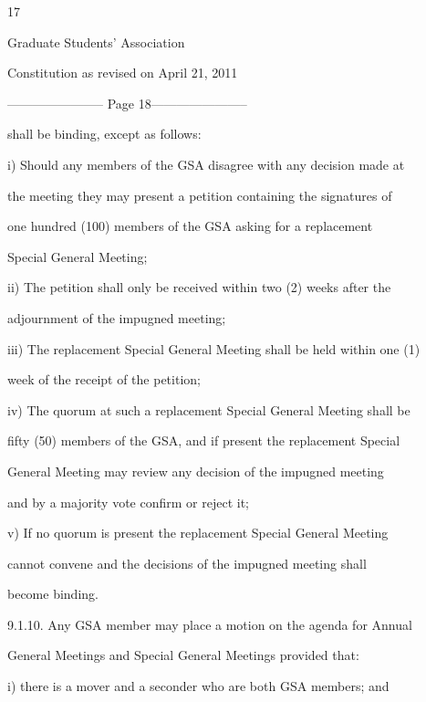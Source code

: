 \documentclass{article}
\begin{document}
     17  



       Graduate Students’ Association  



  Constitution as revised on April 21, 2011  


----------------------- Page 18-----------------------

shall be binding, except as follows:  



i)      Should any members of the GSA disagree with any decision made at  

the  meeting  they  may  present  a  petition  containing  the  signatures  of  

one  hundred  (100)  members  of  the  GSA  asking  for  a  replacement  

Special General Meeting;  



ii)     The  petition  shall  only  be  received  within  two  (2)  weeks  after  the  

adjournment of the impugned meeting;  



iii)    The replacement Special General Meeting shall be held within one (1)  

week of the receipt of the petition;  



iv)     The quorum at such a replacement Special General Meeting shall be  

fifty (50) members of the GSA, and if present the replacement Special  

General  Meeting  may  review  any  decision  of  the  impugned  meeting  

and by a majority vote confirm or reject it;  



v)      If  no  quorum  is  present  the  replacement  Special  General  Meeting  

cannot  convene  and  the  decisions  of  the  impugned  meeting  shall  

become binding.  



9.1.10.     Any GSA member may place a motion on the agenda for Annual  

General Meetings and Special General Meetings provided that:  



i)      there is a mover and a seconder who are both GSA members; and  
\end{document}
